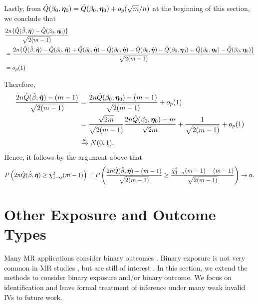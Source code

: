 \documentclass[12pt]{article}
\begin{document}
{Lastly, from $	\hat Q (\beta_0, \bm \eta_0 ) =	\tilde Q (\beta_0, \bm \eta_0 ) + o_p(\sqrt{m}/n) $ at the beginning of this section, we conclude that 
\begin{align}
&	\frac{2n  \{ \hat Q (\hat\beta,   \hat {\bm \eta} )  -  \hat Q (\beta_0, \bm \eta_0 ) \} }{\sqrt{2(m-1)}}  \nonumber\\
&=	\frac{2n  \{ \hat Q ( \hat \beta,   \hat {\bm \eta} )  - \hat Q (\beta_0,   \hat {\bm \eta} ) + \hat Q (\beta_0,   \hat {\bm \eta} )- \tilde{Q} (\beta_0, \hat{\bm \eta})+ \tilde{Q} (\beta_0, \hat{\bm \eta}) -  \tilde{Q} (\beta_0, \bm \eta_0)  + \tilde{Q} (\beta_0, \bm \eta_0)  - \hat Q (\beta_0, \bm \eta_0 ) \} }{\sqrt{2(m-1)}} \nonumber\\
	&  = o_p(1) \label{eq: overidentification}
\end{align}


Therefore, 
\begin{align*}
	\frac{2n  \hat Q (\hat\beta, \hat  {\bm \eta})  - (m-1) }{\sqrt{2(m-1)}} &= \frac{2n  \hat Q (\beta_0, \bm \eta_0 )  - (m-1) }{\sqrt{2(m-1)}} + o_p(1) \\
	&=  \frac{\sqrt{2m}}{\sqrt{2(m-1)}}\frac{2n  \hat Q (\beta_0, \bm \eta_0 )  - m }{\sqrt{2m}}  + \frac{1}{\sqrt{2(m-1)}}+ o_p(1) \\
	&\xrightarrow{d} N(0,1) .
\end{align*}
Hence, it follows by the argument above that 
\begin{align*}
	P\left( 2n \hat Q ( \hat \beta, \hat  {\bm \eta}) \geq  \chi_{1-\alpha}^2(m-1) \right) = 	P\left( \frac{2n \hat Q (\hat \beta, \hat  {\bm \eta}) - (m-1) }{\sqrt{2(m-1)}} \geq \frac{ \chi_{1-\alpha}^2(m-1) - (m-1)}{\sqrt{2(m-1)}} \right) \to \alpha  .
\end{align*}







	



\section{Other Exposure and Outcome Types} \label{sec: binary}

Many MR applications consider binary outcomes \citep{Holmes:2014, Holmes:2017}. Binary exposure is not very common in MR studies \citep{Burgess:2018aa}, but are still of interest \citep{Nead:2015aa,Gage:2017aa, Larsson:2017, Vaucher:2018aa}. In this section, we extend the methods to consider binary exposure and/or binary outcome. We  focus on identification and leave formal treatment of inference under many weak invalid IVs to future work. 

}
\end{document}
